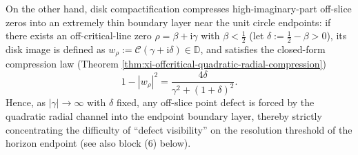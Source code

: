 \begin{enumerate}
  On the other hand, disk compactification compresses high-imaginary-part off-slice zeros into an extremely thin boundary layer near the unit circle endpoints: if there exists an off-critical-line zero \(\rho=\beta+\mathrm{i}\gamma\) with \(\beta<\tfrac12\) (let \(\delta:=\tfrac12-\beta>0\)), its disk image is defined as
  \(
  w_\rho:=\mathcal{C}(\gamma+\mathrm{i}\delta)\in\mathbb{D}
  \),
  and satisfies the closed-form compression law (Theorem \ref{thm:xi-offcritical-quadratic-radial-compression})
  \[
    1-|w_\rho|^2=\frac{4\delta}{\gamma^2+(1+\delta)^2}.
  \]
  Hence, as \(|\gamma|\to\infty\) with \(\delta\) fixed, any off-slice point defect is forced by the quadratic radial channel into the endpoint boundary layer, thereby strictly concentrating the difficulty of ``defect visibility'' on the resolution threshold of the horizon endpoint (see also block (6) below).


\end{enumerate}
